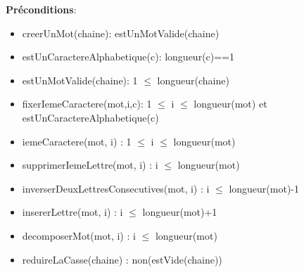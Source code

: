 \documentclass{article}
\begin{document}
    \textbf{Préconditions}: \begin{itemize}[label=$\- $, leftmargin=2cm, itemsep=0cm]
    	\item creerUnMot(chaine):  estUnMotValide(chaine)
    	\item estUnCaractereAlphabetique(c): longueur(c)==1
    	\item estUnMotValide(chaine): 1 $\leq$ longueur(chaine)
    	\item fixerIemeCaractere(mot,i,c): 1 $\leq$ i $\leq$ longueur(mot) et estUnCaractereAlphabetique(c)
        \item iemeCaractere(mot, i) : 1 $\leq$ i $\leq$ longueur(mot)
        \item supprimerIemeLettre(mot, i) : i $\leq$ longueur(mot)
        \item inverserDeuxLettresConsecutives(mot, i) : i $\leq$ longueur(mot)-1
        \item insererLettre(mot, i) : i $\leq$ longueur(mot)+1
        \item decomposerMot(mot, i) : i $\leq$ longueur(mot)
        \item reduireLaCasse(chaine) : non(estVide(chaine))
    \end{itemize}
\end{document}
